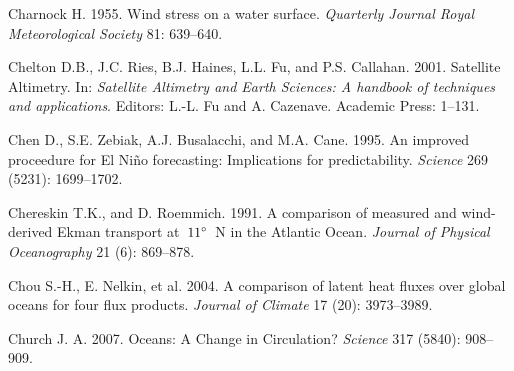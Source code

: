 \begin{thebibliography}{999}
Charnock H.  1955. Wind stress on a water surface. \textit{Quarterly
  Journal Royal Meteorological Society} 81: 639--640.
%

Chelton D.B., J.C. Ries, B.J. Haines, L.L. Fu, and
P.S. Callahan. 2001. Satellite Altimetry. In: \textit{Satellite
  Altimetry and Earth Sciences: A handbook of techniques and
  applications}. Editors: L.-L. Fu and A. Cazenave. Academic Press:
1--131.
%

Chen D., S.E. Zebiak, A.J. Busalacchi, and M.A. Cane.  1995. An
improved proceedure for El Ni\~{n}o forecasting: Implications for
predictability.  \textit{Science} 269 (5231): 1699--1702.
%

Chereskin T.K., and D. Roemmich.  1991. A comparison of measured and
wind-derived Ekman transport at~${11}^\circ$~N in the Atlantic
Ocean.  \textit{Journal of Physical Oceanography} 21 (6): 869--878.
%

Chou S.-H., E. Nelkin, et al.  2004. A comparison of latent heat
fluxes over global oceans for four flux products. \textit{Journal of
  Climate} 17 (20): 3973--3989.
%

Church J. A.  2007. Oceans: A Change in Circulation?  \textit{Science}
317 (5840): 908--909.
%


\end{thebibliography}
